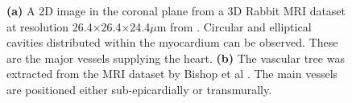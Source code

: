   \begin{figure}[htbp]
		\centering
		\qquad
    \caption{\textbf{(a)} A 2D image in the coronal plane from a 3D Rabbit MRI dataset at resolution 26.4×26.4×24.4$\mu$m from \cite{Burton2006}. Circular and elliptical cavities distributed within the myocardium can be observed.  These are the major vessels supplying the heart. \textbf{(b)} The vascular tree was extracted from the MRI dataset by Bishop et al \cite{Bishop2010}. The main vessels are positioned either sub-epicardially or transmurally.}
	  \label{fig:vessels}
	\end{figure}
  
